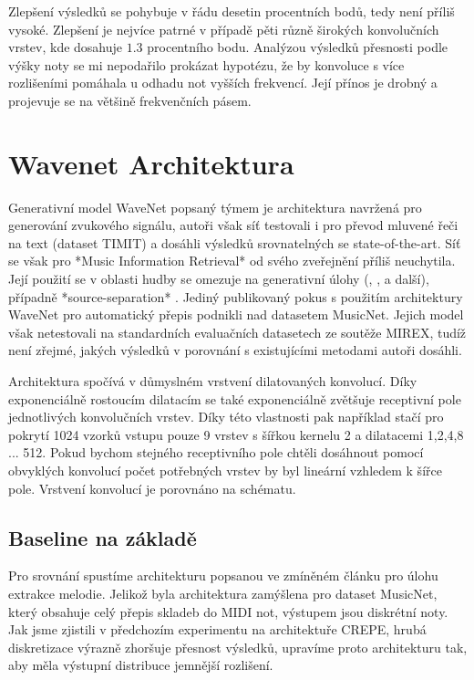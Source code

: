 Zlepšení výsledků se pohybuje v řádu desetin procentních bodů, tedy není příliš vysoké. Zlepšení je nejvíce patrné v případě pěti různě širokých konvolučních vrstev, kde dosahuje $1.3$ procentního bodu. Analýzou výsledků přesnosti podle výšky noty se mi nepodařilo prokázat hypotézu, že by konvoluce s více rozlišeními pomáhala u odhadu not vyšších frekvencí. Její přínos je drobný a projevuje se na většině frekvenčních pásem.


\section{Wavenet Architektura}

Generativní model WaveNet popsaný týmem \cite{Oord2016} je architektura navržená pro generování zvukového signálu, autoři však síť testovali i pro převod mluvené řeči na text (dataset TIMIT) a dosáhli výsledků srovnatelných se state-of-the-art. Síť se však pro *Music Information Retrieval* od svého zveřejnění příliš neuchytila. Její použití se v oblasti hudby se omezuje na generativní úlohy (\cite{Hawthorne2018a}, \cite{Yang2017}, \cite{Engel2017} a další), případně *source-separation* \citep{Stoller2018}. Jediný publikovaný pokus s použitím architektury WaveNet pro automatický přepis podnikli \cite{Martak2018} nad datasetem MusicNet. Jejich model však netestovali na standardních evaluačních datasetech ze soutěže MIREX, tudíž není zřejmé, jakých výsledků v porovnání s existujícími metodami autoři dosáhli.

Architektura spočívá v důmyslném vrstvení dilatovaných konvolucí. Díky exponenciálně rostoucím dilatacím se také exponenciálně zvětšuje receptivní pole jednotlivých konvolučních vrstev. Díky této vlastnosti pak například stačí pro pokrytí 1024 vzorků vstupu pouze 9 vrstev s šířkou kernelu 2 a dilatacemi 1,2,4,8 ... 512. Pokud bychom stejného receptivního pole chtěli dosáhnout pomocí obvyklých konvolucí počet potřebných vrstev by byl lineární vzhledem k šířce pole. Vrstvení konvolucí je porovnáno na schématu. 


\subsection{Baseline na základě \cite{Martak2018}}

Pro srovnání spustíme architekturu popsanou ve zmíněném článku pro úlohu extrakce melodie. Jelikož byla architektura zamýšlena pro dataset MusicNet, který obsahuje celý přepis skladeb do MIDI not, výstupem jsou diskrétní noty. Jak jsme zjistili v předchozím experimentu na architektuře CREPE, hrubá diskretizace výrazně zhoršuje přesnost výsledků, upravíme proto architekturu tak, aby měla výstupní distribuce jemnější rozlišení.
